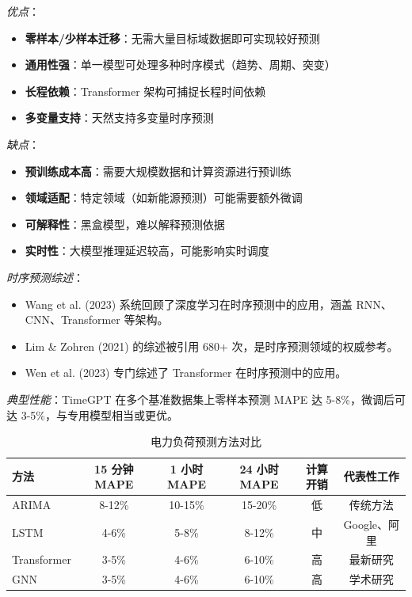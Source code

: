 \documentclass[12pt,a4paper]{article}
\begin{document}
\begin{itemize}
    \textit{优点}：
    \begin{itemize}
        \item \textbf{零样本/少样本迁移}：无需大量目标域数据即可实现较好预测
        \item \textbf{通用性强}：单一模型可处理多种时序模式（趋势、周期、突变）
        \item \textbf{长程依赖}：Transformer 架构可捕捉长程时间依赖
        \item \textbf{多变量支持}：天然支持多变量时序预测
    \end{itemize}
    
    \textit{缺点}：
    \begin{itemize}
        \item \textbf{预训练成本高}：需要大规模数据和计算资源进行预训练
        \item \textbf{领域适配}：特定领域（如新能源预测）可能需要额外微调
        \item \textbf{可解释性}：黑盒模型，难以解释预测依据
        \item \textbf{实时性}：大模型推理延迟较高，可能影响实时调度
    \end{itemize}
    
    \textit{时序预测综述}：
    \begin{itemize}
        \item Wang et al. (2023) 系统回顾了深度学习在时序预测中的应用，涵盖 RNN、CNN、Transformer 等架构\cite{wang2023deep}。
        \item Lim \& Zohren (2021) 的综述被引用 680+ 次，是时序预测领域的权威参考\cite{lim2021comprehensive}。
        \item Wen et al. (2023) 专门综述了 Transformer 在时序预测中的应用\cite{wen2023transformers}。
    \end{itemize}
    
    \textit{典型性能}：TimeGPT 在多个基准数据集上零样本预测 MAPE 达 5-8\%，微调后可达 3-5\%，与专用模型相当或更优。
\end{itemize}

\begin{table}[h]
\centering
\caption{电力负荷预测方法对比}
\label{tab:load-forecast}
\begin{tabular}{@{}lccccc@{}}
\toprule
\textbf{方法} & \textbf{15 分钟 MAPE} & \textbf{1 小时 MAPE} & \textbf{24 小时 MAPE} & \textbf{计算开销} & \textbf{代表性工作} \\
\midrule
ARIMA & 8-12\% & 10-15\% & 15-20\% & 低 & 传统方法 \\
LSTM & 4-6\% & 5-8\% & 8-12\% & 中 & Google、阿里 \\
Transformer & 3-5\% & 4-6\% & 6-10\% & 高 & 最新研究 \\
GNN & 3-5\% & 4-6\% & 6-10\% & 高 & 学术研究 \\
\bottomrule
\end{tabular}
\end{table}
\end{document}
